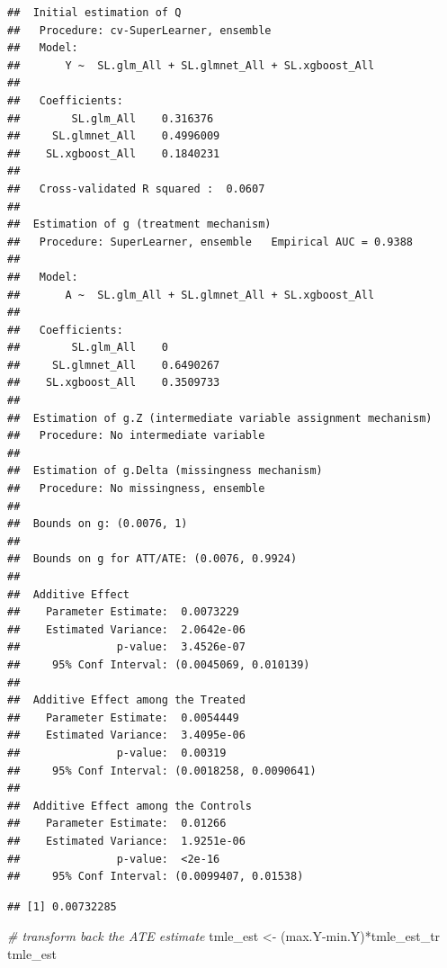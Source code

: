 \documentclass[
]{book}
\newenvironment{Shaded}{\begin{snugshade}}{\end{snugshade}}
\newcommand{\CommentTok}[1]{\textcolor[rgb]{0.56,0.35,0.01}{\textit{#1}}}
\newcommand{\NormalTok}[1]{#1}
\newcommand{\OtherTok}[1]{\textcolor[rgb]{0.56,0.35,0.01}{#1}}
\newcommand{\SpecialCharTok}[1]{\textcolor[rgb]{0.00,0.00,0.00}{#1}}
\begin{document}
\begin{verbatim}
##  Initial estimation of Q
##   Procedure: cv-SuperLearner, ensemble
##   Model:
##       Y ~  SL.glm_All + SL.glmnet_All + SL.xgboost_All
## 
##   Coefficients: 
##        SL.glm_All    0.316376 
##     SL.glmnet_All    0.4996009 
##    SL.xgboost_All    0.1840231 
## 
##   Cross-validated R squared :  0.0607 
## 
##  Estimation of g (treatment mechanism)
##   Procedure: SuperLearner, ensemble   Empirical AUC = 0.9388 
## 
##   Model:
##       A ~  SL.glm_All + SL.glmnet_All + SL.xgboost_All 
## 
##   Coefficients: 
##        SL.glm_All    0 
##     SL.glmnet_All    0.6490267 
##    SL.xgboost_All    0.3509733 
## 
##  Estimation of g.Z (intermediate variable assignment mechanism)
##   Procedure: No intermediate variable 
## 
##  Estimation of g.Delta (missingness mechanism)
##   Procedure: No missingness, ensemble
## 
##  Bounds on g: (0.0076, 1) 
## 
##  Bounds on g for ATT/ATE: (0.0076, 0.9924) 
## 
##  Additive Effect
##    Parameter Estimate:  0.0073229
##    Estimated Variance:  2.0642e-06
##               p-value:  3.4526e-07
##     95% Conf Interval: (0.0045069, 0.010139) 
## 
##  Additive Effect among the Treated
##    Parameter Estimate:  0.0054449
##    Estimated Variance:  3.4095e-06
##               p-value:  0.00319
##     95% Conf Interval: (0.0018258, 0.0090641) 
## 
##  Additive Effect among the Controls
##    Parameter Estimate:  0.01266
##    Estimated Variance:  1.9251e-06
##               p-value:  <2e-16
##     95% Conf Interval: (0.0099407, 0.01538)
\end{verbatim}

\begin{Shaded}
\end{Shaded}

\begin{verbatim}
## [1] 0.00732285
\end{verbatim}

\begin{Shaded}
\begin{Highlighting}[]
\CommentTok{\# transform back the ATE estimate}
\NormalTok{tmle\_est }\OtherTok{\textless{}{-}}\NormalTok{ (max.Y}\SpecialCharTok{{-}}\NormalTok{min.Y)}\SpecialCharTok{*}\NormalTok{tmle\_est\_tr}
\NormalTok{tmle\_est}
\end{Highlighting}
\end{Shaded}
\end{document}
